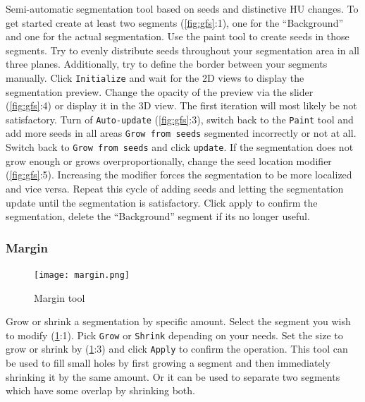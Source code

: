 \noindent
Semi-automatic segmentation tool based on seeds and distinctive HU changes.
To get started create at least two segments (\cref{fig:gfs}:1), one for the ``Background'' and one for the actual segmentation.
Use the paint tool to create seeds in those segments.
Try to evenly distribute seeds throughout your segmentation area in all three planes.
Additionally, try to define the border between your segments manually.
Click \texttt{Initialize} and wait for the 2D views to display the segmentation preview.
Change the opacity of the preview via the slider (\cref{fig:gfs}:4) or display it in the 3D view.
The first iteration will most likely be not satisfactory.
Turn of \texttt{Auto-update} (\cref{fig:gfs}:3), switch back to the \texttt{Paint} tool and add more seeds in all areas \texttt{Grow from seeds} segmented incorrectly or not at all.
Switch back to \texttt{Grow from seeds} and click \texttt{update}.
If the segmentation does not grow enough or grows overproportionally, change the seed location modifier (\cref{fig:gfs}:5).
Increasing the modifier forces the segmentation to be more localized and vice versa.
Repeat this cycle of adding seeds and letting the segmentation update until the segmentation is satisfactory.
Click apply to confirm the segmentation, delete the ``Background'' segment if its no longer useful.
\pagebreak

\subsubsection{Margin}
\begin{figure}[h!]
	\centerline{
		\texttt{[image: margin.png]}}
	\caption{Margin tool}\label{fig:margin}
\end{figure}
\noindent
Grow or shrink a segmentation by specific amount.
Select the segment you wish to modify (\cref{fig:margin}:1).
Pick \texttt{Grow} or \texttt{Shrink} depending on your needs.
Set the size to grow or shrink by (\cref{fig:margin}:3) and click \texttt{Apply} to confirm the operation.
This tool can be used to fill small holes by first growing a segment and then immediately shrinking it by the same amount.
Or it can be used to separate two segments which have some overlap by shrinking both.
\pagebreak

